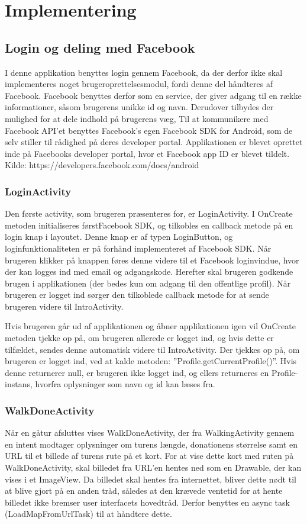 \thispagestyle{fancy}
\chapter{Implementering}
\label{chp:Implementering}

\section{Login og deling med Facebook}
I denne applikation benyttes login gennem Facebook, da der derfor ikke skal implementeres noget brugeroprettelsesmodul, fordi denne del håndteres af Facebook. Facebook benyttes derfor som en service, der giver adgang til en række informationer, såsom brugerens unikke id og navn. Derudover tilbydes der mulighed for at dele indhold på brugerens væg, Til at kommunikere med Facebook API’et benyttes Facebook’s egen Facebook SDK for Android, som de selv stiller til rådighed på deres developer portal. Applikationen er blevet oprettet inde på Facebooks developer portal, hvor et Facebook app ID er blevet tildelt. 
Kilde: https://developers.facebook.com/docs/android

\subsection{LoginActivity}
Den første activity, som brugeren præsenteres for, er LoginActivity. I OnCreate metoden initialiseres førstFacebook SDK, og tilkobles en callback metode på en login knap i layoutet. Denne knap er af typen LoginButton, og loginfunktionaliteten er på forhånd implementeret af Facebook SDK. Når brugeren klikker på knappen føres denne videre til et Facebook loginvindue, hvor der kan logges ind med email og adgangskode. Herefter skal brugeren godkende brugen i applikationen (der bedes kun om adgang til den offentlige profil). Når brugeren er logget ind sørger den tilkoblede callback metode for at sende brugeren videre til IntroActivity.

Hvis brugeren går ud af applikationen og åbner applikationen igen vil OnCreate metoden tjekke op på, om brugeren allerede er logget ind, og hvis dette er tilfældet, sendes denne automatisk videre til IntroActivity. Der tjekkes op på, om brugeren er logget ind, ved at kalde metoden: ”Profile.getCurrentProfile()”. Hvis denne returnerer null, er brugeren ikke logget ind, og ellers returneres en Profile-instans, hvorfra oplysninger som navn og id kan læses fra.
\subsection{WalkDoneActivity}
Når en gåtur afsluttes vises WalkDoneActivity, der fra WalkingActivity gennem en intent modtager oplysninger om turens længde, donationens størrelse samt en URL til et billede af turens rute på et kort. For at vise dette kort med ruten på WalkDoneActivity, skal billedet fra URL’en hentes ned som en Drawable, der kan vises i et ImageView. Da billedet skal hentes fra internettet, bliver dette nødt til at blive gjort på en anden tråd, således at den krævede ventetid for at hente billedet ikke bremser user interfacets hovedtråd. Derfor benyttes en async task (LoadMapFromUrlTask) til at håndtere dette.

